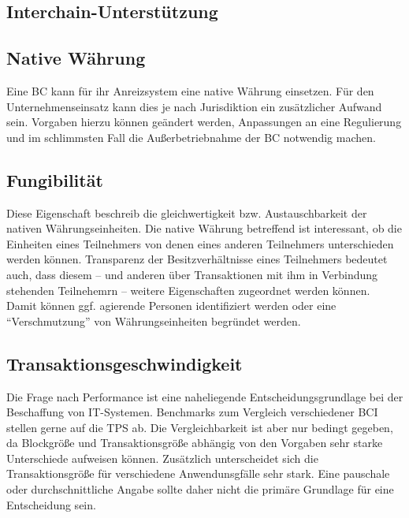 

\subsection{Interchain-Unterstützung}\label{krit:interchain}

\subsection{Native Währung}\label{krit:waehrung}

Eine \gls{BC} kann für ihr Anreizsystem eine native Währung einsetzen.
Für den Unternehmenseinsatz kann dies je nach Jurisdiktion ein zusätzlicher Aufwand sein.
Vorgaben hierzu können geändert werden,  Anpassungen an eine Regulierung und im schlimmsten Fall die Außerbetriebnahme der \gls{BC} notwendig machen.

\subsection{Fungibilität}\label{krit:fungibility}

Diese Eigenschaft beschreib die gleichwertigkeit bzw. Austauschbarkeit der nativen Währungseinheiten.
Die native Währung betreffend ist interessant, ob die Einheiten eines Teilnehmers von denen eines anderen Teilnehmers unterschieden werden können.
Transparenz der Besitzverhältnisse eines Teilnehmers bedeutet auch, dass diesem -- und anderen über Transaktionen mit ihm in Verbindung stehenden Teilnehemrn -- weitere Eigenschaften zugeordnet werden können. Damit können ggf. agierende Personen identifiziert werden oder eine \enquote{Verschmutzung} von Währungseinheiten begründet werden.

\subsection{Transaktionsgeschwindigkeit}\label{krit:transaktionsgeschwindigkeit}

Die Frage nach Performance ist eine naheliegende Entscheidungsgrundlage bei der Beschaffung von IT-Systemen.
Benchmarks zum Vergleich verschiedener \gls{BCI} stellen gerne auf die \gls{TPS} ab.
Die Vergleichbarkeit ist aber nur bedingt gegeben, da Blockgröße und Transaktionsgröße abhängig von den Vorgaben sehr starke Unterschiede aufweisen können.
Zusätzlich unterscheidet sich die Transaktionsgröße für verschiedene Anwendunsgfälle sehr stark.
Eine pauschale oder durchschnittliche Angabe sollte daher nicht die primäre Grundlage für eine Entscheidung sein.

